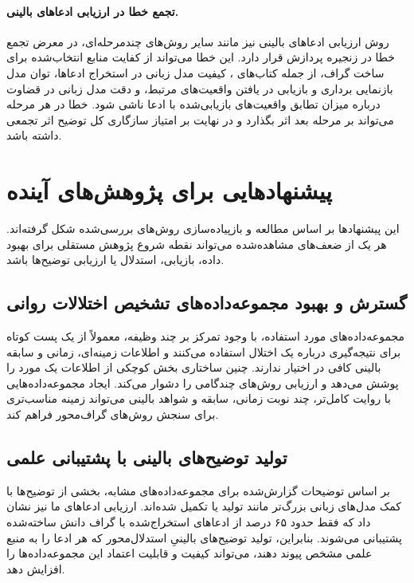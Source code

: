 \paragraph{تجمع خطا در ارزیابی ادعاهای بالینی.}
روش ارزیابی ادعاهای بالینی نیز مانند سایر روش‌های چندمرحله‌ای، در معرض تجمع خطا در زنجیره پردازش قرار دارد. این خطا می‌تواند از کفایت منابع انتخاب‌شده برای ساخت گراف، از جمله کتاب‌های ، کیفیت مدل زبانی در استخراج ادعاها، توان مدل بازنمایی برداری و بازیابی در یافتن واقعیت‌های مرتبط، و دقت مدل زبانی در قضاوت درباره میزان تطابق واقعیت‌های بازیابی‌شده با ادعا ناشی شود. خطا در هر مرحله می‌تواند بر مرحله بعد اثر بگذارد و در نهایت بر امتیاز سازگاری کل توضیح اثر تجمعی داشته باشد.

\section{پیشنهادهایی برای پژوهش‌های آینده}
این پیشنهادها بر اساس مطالعه و بازپیاده‌سازی روش‌های بررسی‌شده شکل گرفته‌اند. هر یک از ضعف‌های مشاهده‌شده می‌تواند نقطه شروع پژوهش مستقلی برای بهبود داده، بازیابی، استدلال یا ارزیابی توضیح‌ها باشد.

\subsection{گسترش و بهبود مجموعه‌داده‌های تشخیص اختلالات روانی}

مجموعه‌داده‌های مورد استفاده، با وجود تمرکز بر چند وظیفه، معمولاً از یک پست کوتاه برای نتیجه‌گیری درباره یک اختلال استفاده می‌کنند و اطلاعات زمینه‌ای، زمانی و سابقه بالینی کافی در اختیار ندارند. چنین ساختاری بخش کوچکی از اطلاعات یک مورد را پوشش می‌دهد و ارزیابی روش‌های چندگامی را دشوار می‌کند. ایجاد مجموعه‌داده‌هایی با روایت کامل‌تر، چند نوبت زمانی، سابقه و شواهد بالینی می‌تواند زمینه مناسب‌تری برای سنجش روش‌های گراف‌محور فراهم کند.

\subsection{تولید توضیح‌های بالینی با پشتیبانی علمی}

بر اساس توضیحات گزارش‌شده برای مجموعه‌داده‌های مشابه، بخشی از توضیح‌ها با کمک مدل‌های زبانی بزرگ‌تر مانند  تولید یا تکمیل شده‌اند. ارزیابی ادعاهای ما نیز نشان داد که فقط حدود ۶۵ درصد از ادعاهای استخراج‌شده با گراف دانش ساخته‌شده پشتیبانی می‌شوند. بنابراین، تولید توضیح‌های بالینیِ استدلال‌محور که هر ادعا را به منبع علمی مشخص پیوند دهند، می‌تواند کیفیت و قابلیت اعتماد این مجموعه‌داده‌ها را افزایش دهد.

